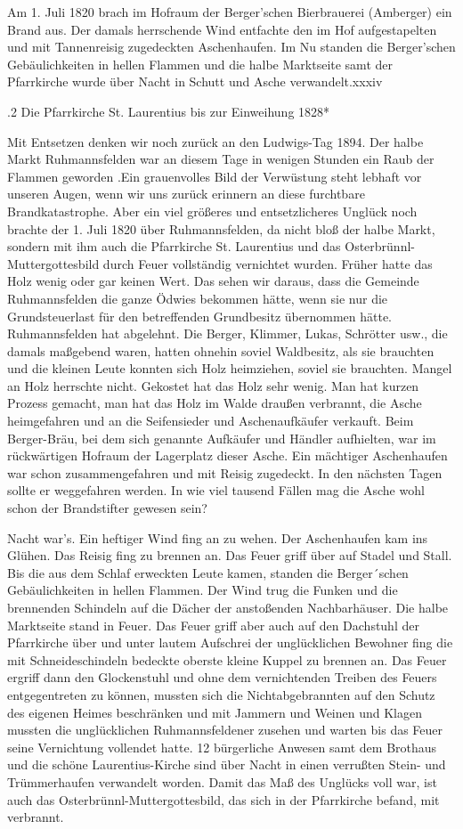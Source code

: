 \documentclass[12pt,a4paper]{book}
\begin{document}
Am 1. Juli 1820 brach im Hofraum der Berger'schen Bierbrauerei (Amberger) ein
Brand aus. Der damals herrschende Wind entfachte den im Hof aufgestapelten und
mit Tannenreisig zugedeckten Aschenhaufen. Im Nu standen die Berger'schen
Gebäulichkeiten in hellen Flammen und die halbe Marktseite samt der Pfarrkirche
wurde über Nacht in Schutt und Asche verwandelt.xxxiv

.2 Die Pfarrkirche St. Laurentius bis zur Einweihung 1828*

Mit Entsetzen denken wir noch zurück an den Ludwigs-Tag 1894. Der halbe Markt
Ruhmannsfelden war an diesem Tage in wenigen Stunden ein Raub der Flammen
geworden .Ein grauenvolles Bild der Verwüstung steht lebhaft vor unseren Augen,
wenn wir uns zurück erinnern an diese furchtbare Brandkatastrophe. Aber ein viel
größeres und entsetzlicheres Unglück noch brachte der 1. Juli 1820 über
Ruhmannsfelden, da nicht bloß der halbe Markt, sondern mit ihm auch die
Pfarrkirche St. Laurentius und das Osterbrünnl-Muttergottesbild durch Feuer
vollständig vernichtet wurden. Früher hatte das Holz wenig oder gar keinen Wert.
Das sehen wir daraus, dass die Gemeinde Ruhmannsfelden die ganze Ödwies bekommen
hätte, wenn sie nur die Grundsteuerlast für den betreffenden Grundbesitz
übernommen hätte. Ruhmannsfelden hat abgelehnt. Die Berger, Klimmer, Lukas,
Schrötter usw., die damals maßgebend waren, hatten ohnehin soviel Waldbesitz,
als sie brauchten und die kleinen Leute konnten sich Holz heimziehen, soviel sie
brauchten. Mangel an Holz herrschte nicht. Gekostet hat das Holz sehr wenig. Man
hat kurzen Prozess gemacht, man hat das Holz im Walde draußen verbrannt, die
Asche heimgefahren und an die Seifensieder und Aschenaufkäufer verkauft. Beim
Berger-Bräu, bei dem sich genannte Aufkäufer und Händler aufhielten, war im
rückwärtigen Hofraum der Lagerplatz dieser Asche. Ein mächtiger Aschenhaufen war
schon zusammengefahren und mit Reisig zugedeckt. In den nächsten Tagen sollte er
weggefahren werden. In wie viel tausend Fällen mag die Asche wohl schon der
Brandstifter gewesen sein?

Nacht war's. Ein heftiger Wind fing an zu wehen. Der Aschenhaufen kam ins
Glühen. Das Reisig fing zu brennen an. Das Feuer griff über auf Stadel und
Stall. Bis die aus dem Schlaf erweckten Leute kamen, standen die Berger´schen
Gebäulichkeiten in hellen Flammen. Der Wind trug die Funken und die brennenden
Schindeln auf die Dächer der anstoßenden Nachbarhäuser. Die halbe Marktseite
stand in Feuer. Das Feuer griff aber auch auf den Dachstuhl der Pfarrkirche über
und unter lautem Aufschrei der unglücklichen Bewohner fing die mit
Schneideschindeln bedeckte oberste kleine Kuppel zu brennen an. Das Feuer
ergriff dann den Glockenstuhl und ohne dem vernichtenden Treiben des Feuers
entgegentreten zu können, mussten sich die Nichtabgebrannten auf den Schutz des
eigenen Heimes beschränken und mit Jammern und Weinen und Klagen mussten die
unglücklichen Ruhmannsfeldener zusehen und warten bis das Feuer seine
Vernichtung vollendet hatte. 12 bürgerliche Anwesen samt dem Brothaus und die
schöne Laurentius-Kirche sind über Nacht in einen verrußten Stein- und
Trümmerhaufen verwandelt worden. Damit das Maß des Unglücks voll war, ist auch
das Osterbrünnl-Muttergottesbild, das sich in der Pfarrkirche befand, mit
verbrannt.
\end{document}
